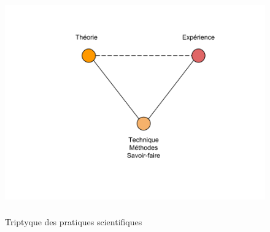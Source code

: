 \begin{figure}
    \centering
    \includegraphics[width=5.0559in,height=3.7894in]{figures/chap3/chapitre3-img1.png}
    \caption[Triptyque des pratiques scientifiques]{Triptyque des pratiques scientifiques}
\end{figure}


